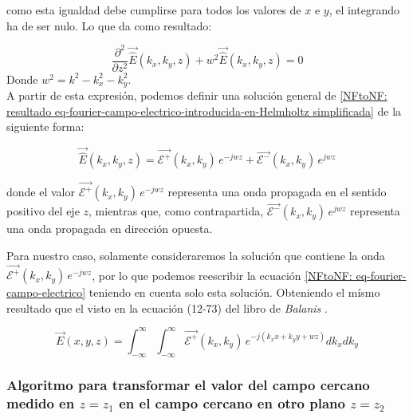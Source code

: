 \documentclass{article}
\begin{document}
como esta igualdad debe cumplirse para todos los valores de $x$ e $y$, el integrando ha de ser nulo. Lo que da como resultado:

\begin{equation}
\frac{\partial^{2}}{\partial
z^{2}}\vec{\hat{E}}(k_{x},k_{y},z)+w^{2}\vec{\hat{E}}(k_{x},k_{y},z)=0
\label{NFtoNF: resultado eq-fourier-campo-electrico-introducida-en-Helmholtz simplificada}
\end{equation}
Donde $w^{2}=k^{2}-k_{x}^{2}-k_{y}^{2}$.
\\

A partir de esta expresión, podemos definir una solución general de \eqref{NFtoNF: resultado eq-fourier-campo-electrico-introducida-en-Helmholtz simplificada} de la siguiente forma:

\begin{equation}
\vec{\hat{E}}(k_{x},k_{y},z)=\vec{\mathcal{E}^{+}}(k_{x},k_{y})\,e^{-j
w z}+\vec{\mathcal{E}^{-}}(k_{x},k_{y})\,e^{j w z}
\label{NFtoNF: solucion eq-fourier-campo-electrico-en-Helmholtz-general}
\end{equation}

donde el valor $\vec{\mathcal{E}^{+}}(k_{x},k_{y})\,e^{-j w z}$  representa una onda propagada en el sentido positivo del eje $z$, mientras que, como contrapartida, $\vec{\mathcal{E}^{-}}(k_{x},k_{y})\,e^{j w z}$ representa una onda propagada en dirección opuesta.\\

\newpage

Para nuestro caso, solamente consideraremos la solución que contiene la onda $\vec{\mathcal{E}^{+}}(k_{x},k_{y})\,e^{-j w z}$, por lo que podemos reescribir la ecuación \eqref{NFtoNF: eq-fourier-campo-electrico} teniendo en cuenta solo esta solución. Obteniendo el mísmo resultado que el visto en la ecuación (12-73) del libro de \textit{Balanis}  \autocite{Balanis_2016}.

\begin{equation}
\vec{E}(x,y,z)=\int_{-\infty}^{\infty}\int_{-\infty}^{\infty}\vec{\mathcal{E}^{+}}(k_{x},k_{y})
\,e^{-j (k_{x} x+k_{y} y+w  z)} dk_{x} dk_{y}
\label{NFtoNF:eq-fourier-balanis}
\end{equation}


\subsubsection{Algoritmo para transformar el valor del campo cercano medido en $z=z_{1}$ en el campo cercano en otro plano $z=z_{2}$}
\label{sec:Algoritmo NFtoNF}
\end{document}
